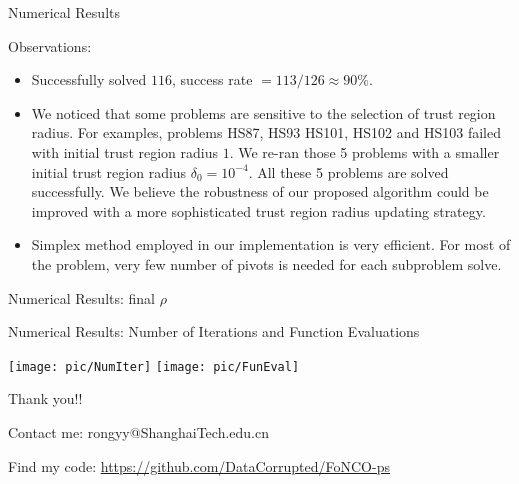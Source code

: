 \documentclass[8pt]{beamer}
\begin{document}
\begin{frame}{Numerical Results}


Observations: 
\vfill
\begin{itemize}
\item  
Successfully solved $116$, success rate   $  = 113/126 \approx 90 \%$. 
\vfill
\item   
We noticed that some problems
 are sensitive to the selection of trust region radius. For examples, problems HS87, HS93 HS101, HS102 and HS103 failed with initial trust region radius $1$. We re-ran those 5 problems with a smaller initial trust region radius $\delta_{0} = 10^{-4}$. All these 5 problems are solved successfully. We believe the robustness of our proposed algorithm could be improved with a more sophisticated trust region radius updating strategy. 
 \item Simplex method employed in our implementation is very efficient. For most of the problem, very few number of pivots is needed for each subproblem solve. 
\end{itemize}



\end{frame}

 

\begin{frame}[c]{Numerical Results:  final $\rho$   }

\begin{figure}[H]


\end{figure}

\end{frame}

 


\begin{frame}[c]{Numerical Results:  Number of Iterations and Function Evaluations}

 \texttt{[image: pic/NumIter]}
  \texttt{[image: pic/FunEval]}
 
\end{frame}

 



\begin{frame}[c]{ }

\centerline{\red \huge Thank you!!}

\vspace{3em}

\centerline{\red \huge  Contact me: rongyy@ShanghaiTech.edu.cn}

\vspace{3em}





\centerline{\red Find my code: \underline  {  https://github.com/DataCorrupted/FoNCO-ps}}



\end{frame}
\end{document}
